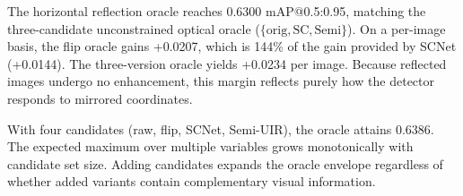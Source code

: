 \documentclass[runningheads]{llncs}
\begin{document}
\begin{table}[t]
    \centering
    \caption{Oracle comparison between optical enhancers and horizontal reflection on RUOD test set.}
    \label{tab:noise}
\end{table}

The horizontal reflection oracle reaches 0.6300 mAP@0.5:0.95, matching the three-candidate unconstrained optical oracle ($\{\text{orig}, \text{SC}, \text{Semi}\}$). On a per-image basis, the flip oracle gains +0.0207, which is 144\% of the gain provided by SCNet (+0.0144). The three-version oracle yields +0.0234 per image. Because reflected images undergo no enhancement, this margin reflects purely how the detector responds to mirrored coordinates.

With four candidates (raw, flip, SCNet, Semi-UIR), the oracle attains 0.6386. The expected maximum over multiple variables grows monotonically with candidate set size. Adding candidates expands the oracle envelope regardless of whether added variants contain complementary visual information.
\end{document}
